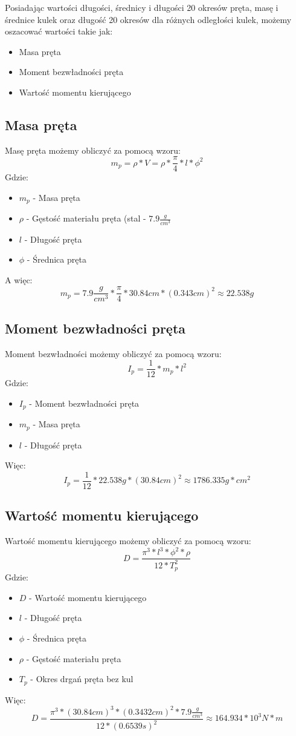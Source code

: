\documentclass{article}
\begin{document}
{Posiadając wartości długości, średnicy i długości 20 okresów pręta, masę i średnice kulek oraz długość 20 okresów dla różnych odległości kulek, możemy oszacować wartości takie jak:
\begin{itemize}
    \item Masa pręta
    \item Moment bezwładności pręta
    \item Wartość momentu kierującego
\end{itemize}

\subsection*{Masa pręta}
Masę pręta możemy obliczyć za pomocą wzoru:
\[m_p=\rho*V=\rho*\frac{\pi}{4}*l*\phi^2\]
Gdzie:
\begin{itemize}
    \item $m_p$ - Masa pręta
    \item $\rho$ - Gęstość materiału pręta (stal - $7.9\frac{g}{cm^3}$
    \item $l$ - Długość pręta
    \item $\phi$ - Średnica pręta
\end{itemize}
A więc:
\[m_p = 7.9\frac{g}{cm^3}*\frac{\pi}{4}*30.84cm*(0.343cm)^2\approx22.538g\]

\subsection*{Moment bezwładności pręta}
Moment bezwładności możemy obliczyć za pomocą wzoru:
\[I_p=\frac{1}{12}*m_p*l^2\]
Gdzie:
\begin{itemize}
    \item $I_p$ - Moment bezwładności pręta
    \item $m_p$ - Masa pręta
    \item $l$ - Długość pręta
\end{itemize}
Więc:
\[I_p = \frac{1}{12}*22.538g*(30.84cm)^2\approx1786.335g*cm^2\]

\subsection*{Wartość momentu kierującego}
Wartość momentu kierującego możemy obliczyć za pomocą wzoru:
\[D = \frac{\pi^3*l^3*\phi^2*\rho}{12*T_p^2}\]
Gdzie:
\begin{itemize}
    \item $D$ - Wartość momentu kierującego
    \item $l$ - Długość pręta
    \item $\phi$ - Średnica pręta
    \item $\rho$ - Gęstość materiału pręta
    \item $T_p$ - Okres drgań pręta bez kul
\end{itemize}
Więc:
\[D = \frac{\pi^3*(30.84cm)^3*(0.3432cm)^2*7.9\frac{g}{cm^3}}{12*(0.6539s)^2}\approx164.934*10^3N*m\]

}
\end{document}
